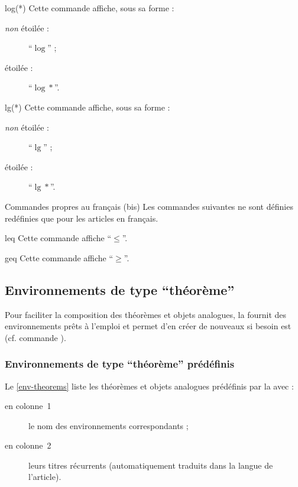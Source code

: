 \begin{docCommand}{log(*)}{}
  Cette commande affiche, sous sa forme :
  \begin{description}
  \item[\emph{non} étoilée :] \enquote{$\log$} ;
  \item[étoilée :] \enquote{$\log*$}.
  \end{description}
\end{docCommand}

\begin{docCommand}{lg(*)}{}
  Cette commande affiche, sous sa forme :
  \begin{description}
  \item[\emph{non} étoilée :] \enquote{$\lg$} ;
  \item[étoilée :] \enquote{$\lg*$}.
  \end{description}
\end{docCommand}

\begin{dbremark}{Commandes propres au français (bis)}{}
  Les commandes suivantes ne sont définies redéfinies que pour les articles en
  français.
\end{dbremark}

\begin{docCommand}{leq}{}
  Cette commande affiche \enquote{$\leq$}.
\end{docCommand}
\begin{docCommand}{geq}{}
  Cette commande affiche \enquote{$\geq$}.
\end{docCommand}

\subsection{Environnements de type \enquote{théorème}}

Pour faciliter la composition des théorèmes et objets analogues, la
\nwejmauthorcl{} fournit des environnements prêts à l'emploi et permet d'en
créer de nouveaux si besoin est (cf. commande ).

\subsubsection{Environnements de type \enquote{théorème} prédéfinis}
\label{sec:envir-de-type}

Le \vref{env-theorems} liste les théorèmes et objets analogues prédéfinis par la
\nwejmauthorcl{} avec :
\begin{description}
\item[en colonne~1] le nom des environnements correspondants ;
\item[en colonne~2] leurs titres récurrents (automatiquement traduits dans la
  langue de l'article).
\end{description}

